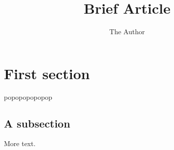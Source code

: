 \documentclass[11pt]{article}
\title{Brief Article}
\author{The Author}
\begin{document}
\maketitle

\section{First section}


popopopopopop

\subsection{A subsection}

More text.
\end{document}
